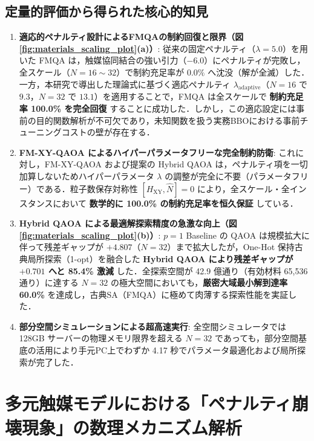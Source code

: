 \documentclass[11pt,a4paper]{ltjsarticle}
\begin{document}
\subsection{定量的評価から得られた核心的知見}
\begin{enumerate}\setlength{\itemsep}{2pt}
    \item \textbf{適応的ペナルティ設計によるFMQAの制約回復と限界（図\ref{fig:materials_scaling_plot}(a)）}:
    従来の固定ペナルティ（$\lambda=5.0$）を用いた FMQA は，触媒協同結合の強い引力（$-6.0$）にペナルティが完敗し，全スケール（$N=16 \sim 32$）で制約充足率が $0.0\%$ へ沈没（解が全滅）した．一方，本研究で導出した理論式に基づく適応ペナルティ $\lambda_{\mathrm{adaptive}}$（$N=16$ で $9.3$，$N=32$ で $13.1$）を適用することで，FMQA は全スケールで \textbf{制約充足率 100.0\% を完全回復} することに成功した．しかし，この適応設定には事前の目的関数解析が不可欠であり，未知関数を扱う実務BBOにおける事前チューニングコストの壁が存在する．
    \item \textbf{FM-XY-QAOA によるハイパーパラメータフリーな完全制約防衛}:
    これに対し，FM-XY-QAOA および提案の Hybrid QAOA は，ペナルティ項を一切加算しないためハイパーパラメータ $\lambda$ の調整が完全に不要（パラメータフリー）である．粒子数保存対称性 $[H_{\mathrm{XY}}, \hat{N}] = 0$ により，全スケール・全インスタンスにおいて \textbf{数学的に 100.0\% の制約充足率を恒久保証} している．
    \item \textbf{Hybrid QAOA による最適解探索精度の急激な向上（図\ref{fig:materials_scaling_plot}(b)）}:
    $p=1$ Baseline の QAOA は規模拡大に伴って残差ギャップが $+4.807$（$N=32$）まで拡大したが，One-Hot 保持古典局所探索（1-opt）を融合した \textbf{Hybrid QAOA により残差ギャップが $+0.701$ へと 85.4\% 激減} した．全探索空間が 42.9 億通り（有効材料 65,536 通り）に達する $N=32$ の極大空間においても，\textbf{厳密大域最小解到達率 60.0\%} を達成し，古典SA（FMQA）に極めて肉薄する探索性能を実証した．
    \item \textbf{部分空間シミュレーションによる超高速実行}:
    全空間シミュレータでは 128GB サーバーの物理メモリ限界を超える $N=32$ であっても，部分空間基底の活用により手元PC上でわずか 4.17 秒でパラメータ最適化および局所探索が完了した．
\end{enumerate}

\section{多元触媒モデルにおける「ペナルティ崩壊現象」の数理メカニズム解析}
\label{sec:penalty_collapse}
\vspace{-1mm}
\end{document}
